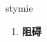 
\begin{frame}
{\huge stymie}
\begin{center}
\begin{enumerate}\Large
  \item \textbf{阻碍}
\end{enumerate}
\end{center}
\end{frame}
